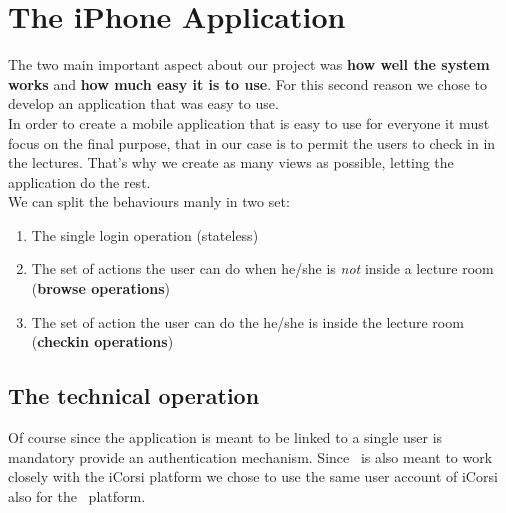 \section{The iPhone Application}
The two main important aspect about our project was \textbf{how well the system works} and \textbf{how much easy it is to use}. For this second reason we chose to develop an application that was easy to use.\\

In order to create a mobile application that is easy to use for everyone it must focus on the final purpose, that in our case is to permit the users to check in in the lectures. That's why we create as many views as possible, letting the application do the rest.\\
We can split the behaviours manly in two set:
\begin{enumerate}
\item The single login operation (stateless)
\item The set of actions the user can do when he/she is \emph{not} inside a lecture room (\textbf{browse operations})
\item The set of action the user can do the he/she is inside the lecture room (\textbf{checkin operations})
\end{enumerate}

\subsection{The technical operation}
Of course since the application is meant to be linked to a single user is mandatory provide an authentication mechanism. Since \UB\ is also meant to work closely with the iCorsi platform we chose to use the same user account of iCorsi also for the \UB\ platform.

